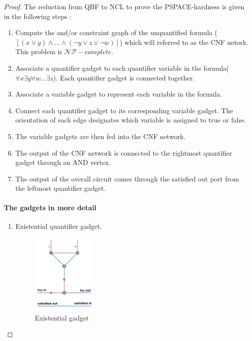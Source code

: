 \begin{proof}
The reduction from QBF to NCL to prove the PSPACE-hardness is given in the following steps : 
\begin{enumerate}
    \item Compute the and/or constraint graph of the unquantified formula ($[(x \vee y) \wedge \dots \wedge (\neg y \vee z \vee \neg w)]$) which will referred to as the CNF netork. This problem is 
    $\mathcal{NP}-complete$\cite{goos_nondeterministic_2002}.
    \item Associate a quantifier gadget to each quantifier variable in the formula($\forall x \exists y \forall w \dots \exists z$). Each quantifier gadget is connected together.
    \item Associate a variable gadget to represent each variable in the formula. 
    \item Connect each quantifier gadget to its corresponding variable gadget. The orientation of each edge designates which variable is assigned to true or false.  
    \item The variable gadgets are then fed into the CNF network. 
    \item The output of the CNF network is connected to the rightmost quantifier gadget through an AND vertex. 
    \item The output of the overall circuit comes through the satisfied out port from the leftmost quantifier gadget. 
\end{enumerate}

\paragraph{The gadgets in more detail} \hfill \break
\begin{enumerate}
   \item Existential quantifier gadget.
   \begin{figure}[H]
    \centering
    \includegraphics[width=0.3\textwidth]{res/existential.pdf}
    \caption{Existential gadget}
    \label{fig:circle}
    \end{figure}
    

\end{enumerate}
\end{proof}
